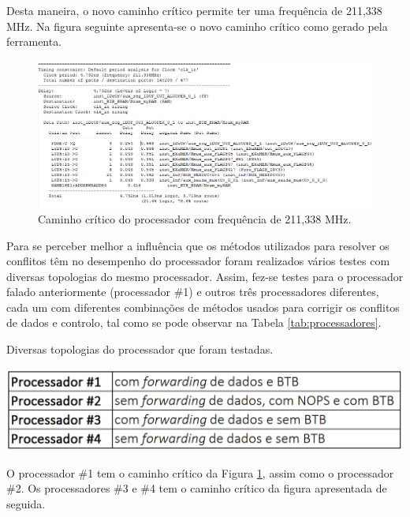 \documentclass[11pt]{article}
\numberwithin{equation}{section}
\begin{document}
Desta maneira, o novo caminho crítico permite ter uma frequência de 211,338 MHz. Na figura seguinte apresenta-se o novo caminho crítico como gerado pela ferramenta.

\begin{figure}[H]
	\centering
	\includegraphics[keepaspectratio=true, scale=0.35]{imagens/freq211}
	\vspace{-0.5em}
	\caption{Caminho crítico do processador com frequência de 211,338 MHz.}
	\label{fig:211}
	\vspace{-0.8em}
\end{figure} 

Para se perceber melhor a influência que os métodos utilizados para resolver os conflitos têm no desempenho do processador foram realizados vários testes com diversas topologias do mesmo processador. Assim, fez-se testes para o processador falado anteriormente (processador \#1) e outros três processadores diferentes, cada um com diferentes combinações de métodos usados para corrigir os conflitos de dados e controlo, tal como se pode observar na Tabela \ref{tab:processadores}.

\begin{table}[H]
	\centering
	\caption{Diversas topologias do processador que foram testadas.}
	\vspace{-1.5mm}
	\includegraphics[keepaspectratio=true, scale=0.40]{tabelas/processadores}
	\label{tab:processadores}
\end{table}

O processador \#1 tem o caminho crítico da Figura \ref{fig:211}, assim como o processador \#2. Os processadores \#3 e \#4 tem o caminho crítico da figura apresentada de seguida.
\end{document}
